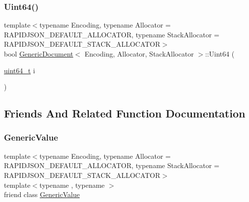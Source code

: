 \mbox{\label{classGenericDocument_a50ac3451a1afd0ce248dcc023d5e09e8}} 
\subsubsection{\texorpdfstring{Uint64()}{Uint64()}}
{\footnotesize\ttfamily template$<$typename Encoding, typename Allocator = R\+A\+P\+I\+D\+J\+S\+O\+N\+\_\+\+D\+E\+F\+A\+U\+L\+T\+\_\+\+A\+L\+L\+O\+C\+A\+T\+OR, typename Stack\+Allocator = R\+A\+P\+I\+D\+J\+S\+O\+N\+\_\+\+D\+E\+F\+A\+U\+L\+T\+\_\+\+S\+T\+A\+C\+K\+\_\+\+A\+L\+L\+O\+C\+A\+T\+OR$>$ \\
bool \hyperlink{classGenericDocument}{Generic\+Document}$<$ Encoding, Allocator, Stack\+Allocator $>$\+::Uint64 (\begin{DoxyParamCaption}\item[{\hyperlink{stdint_8h_aec6fcb673ff035718c238c8c9d544c47}{uint64\+\_\+t}}]{i }\end{DoxyParamCaption})\hspace{0.3cm}{\ttfamily [inline]}}



\subsection{Friends And Related Function Documentation}
\mbox{\label{classGenericDocument_a899449e1a645b5e377af059fb61113d8}} 
\subsubsection{\texorpdfstring{Generic\+Value}{GenericValue}}
{\footnotesize\ttfamily template$<$typename Encoding, typename Allocator = R\+A\+P\+I\+D\+J\+S\+O\+N\+\_\+\+D\+E\+F\+A\+U\+L\+T\+\_\+\+A\+L\+L\+O\+C\+A\+T\+OR, typename Stack\+Allocator = R\+A\+P\+I\+D\+J\+S\+O\+N\+\_\+\+D\+E\+F\+A\+U\+L\+T\+\_\+\+S\+T\+A\+C\+K\+\_\+\+A\+L\+L\+O\+C\+A\+T\+OR$>$ \\
template$<$typename , typename $>$ \\
friend class \hyperlink{classGenericValue}{Generic\+Value}\hspace{0.3cm}{\ttfamily [friend]}}

